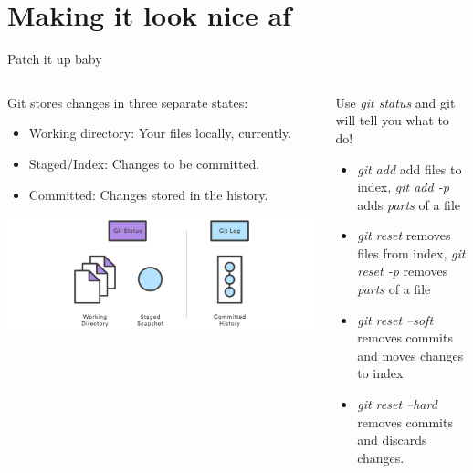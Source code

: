 \documentclass[10pt]{beamer}
\begin{document}
\section{Making it look nice af}
\begin{frame}{Patch it up baby}
  \begin{columns}[T] %
     \begin{column}[T]{.5\textwidth} %
      Git stores changes in three separate states:

      \begin{itemize}
        \item {Working directory}: Your files locally, currently.
        \item {Staged/Index}: Changes to be committed.
        \item {Committed}: Changes stored in the history.
      \end{itemize}

      \includegraphics[width=\textwidth]{status}

     \end{column}
     \begin{column}[T]{.5\textwidth} %
      Use \textit{git status} and git will tell you what to do!
      \begin{itemize}
        \item \textit{git add} add files to index, \textit{git add -p} adds \textit{parts} of a file
        \item \textit{git reset} removes files from index, \textit{git reset -p} removes \textit{parts} of a file
        \item \textit{git reset --soft} removes commits and moves changes to index 
        \item \textit{git reset --hard} removes commits and discards changes.
      \end{itemize}
     \end{column}
   \end{columns}
\end{frame}
\end{document}
